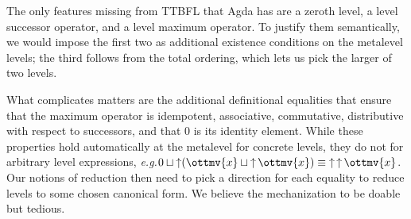 \documentclass[a4paper,UKenglish,cleveref,autoref,thm-restate]{lipics-v2021}
\makeatletter
\newcommand{\lang}{TTBFL\@\xspace}
\newcommand{\eg}{\textit{e.g.}\@\xspace}
\makeatother
\begin{document}
The only features missing from \lang that Agda has are a zeroth level,
a level successor operator, and a level maximum operator.
To justify them semantically,
we would impose the first two as additional existence conditions on the metalevel levels;
the third follows from the total ordering, which lets us pick the larger of two levels.
%

What complicates matters are the additional definitional equalities that
ensure that the maximum operator is idempotent, associative, commutative,
distributive with respect to successors,
and that $0$ is its identity element.
While these properties hold automatically at the metalevel for concrete levels,
they do not for arbitrary level expressions,
\eg $   0   \sqcup   \mathop{\uparrow}   (  \ottmv{x}  \sqcup   \mathop{\uparrow}  \ottmv{x}   )     \equiv   \mathop{\uparrow}   \mathop{\uparrow}  \ottmv{x}   $.
Our notions of reduction then need to pick a direction for each equality
to reduce levels to some chosen canonical form.
We believe the mechanization to be doable but tedious.
\end{document}
